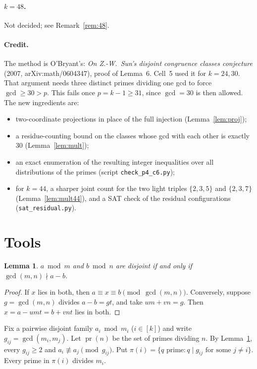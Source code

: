 \documentclass[11pt]{article}
\newtheorem{lemma}[theorem]{Lemma}
\theoremstyle{definition}
\theoremstyle{remark}
\newcommand{\pr}{\operatorname{pr}}
\begin{document}
\paragraph{$k=48$.} Not decided; see Remark~\ref{rem:48}.

\paragraph{Credit.} The method is O'Bryant's: \emph{On Z.-W.\ Sun's disjoint congruence classes
conjecture} (2007, arXiv:math/0604347), proof of Lemma~6. Cell~5 used it for $k=24,30$. That
argument needs three distinct primes dividing one gcd to force $\gcd\ge30>p$. This fails once
$p=k-1\ge31$, since $\gcd=30$ is then allowed. The new ingredients are:
\begin{itemize}
\item two-coordinate projections in place of the full injection (Lemma~\ref{lem:proj});
\item a residue-counting bound on the classes whose gcd with each other is exactly $30$
  (Lemma~\ref{lem:mult});
\item an exact enumeration of the resulting integer inequalities over all distributions of the
  primes (script \texttt{check\_p4\_c6.py});
\item for $k=44$, a sharper joint count for the two light triples $\{2,3,5\}$ and $\{2,3,7\}$
  (Lemma~\ref{lem:mult44}), and a SAT check of the residual configurations
  (\texttt{sat\_residual.py}).
\end{itemize}

\section{Tools}

\begin{lemma}\label{lem:crt}
$a\bmod m$ and $b\bmod n$ are disjoint if and only if $\gcd(m,n)\nmid a-b$.
\end{lemma}
\begin{proof}
If $x$ lies in both, then $a\equiv x\equiv b\pmod{\gcd(m,n)}$. Conversely, suppose
$g=\gcd(m,n)$ divides $a-b=gt$, and take $um+vn=g$. Then $x=a-umt=b+vnt$ lies in both.
\end{proof}

Fix a pairwise disjoint family $a_i\bmod m_i$ ($i\in[k]$) and write $g_{ij}=\gcd(m_i,m_j)$. Let
$\pr(n)$ be the set of primes dividing $n$. By Lemma~\ref{lem:crt}, every $g_{ij}\ge2$ and
$a_i\not\equiv a_j\pmod{g_{ij}}$. Put
$\pi(i)=\{q \text{ prime}: q\mid g_{ij}\text{ for some }j\ne i\}$. Every prime in $\pi(i)$
divides $m_i$.
\end{document}
